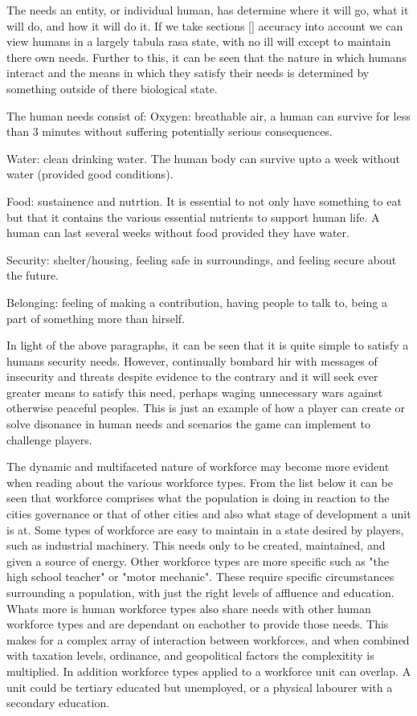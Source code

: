 The needs an entity, or individual human, has determine where it will go, what it will do, and how it will do it. If we take sections [] accuracy into account we can view humans in a largely tabula rasa state, with no ill will except to maintain there own needs. Further to this, it can be seen that the nature in which humans interact and the means in which they satisfy their needs is determined by something outside of there biological state. 

The human needs consist of:
Oxygen: breathable air, a human can survive for less than 3 minutes without suffering potentially serious consequences. 

Water: clean drinking water. The human body can survive upto a week without water (provided good conditions). 

Food: sustainence and nutrtion. It is essential to not only have something to eat but that it contains the various essential nutrients to support human life. A human can last several weeks without food provided they have water.

Security: shelter/housing, feeling safe in surroundings, and feeling secure about the future.

Belonging: feeling of making a contribution, having people to talk to, being a part of something more than hirself.

In light of the above paragraphs, it can be seen that it is quite simple to satisfy a humans security needs. However, continually bombard hir with messages of insecurity and threats despite evidence to the contrary and it will seek ever greater means to satisfy this need, perhaps waging unnecessary wars against otherwise peaceful peoples. This is just an example of how a player can create or solve disonance in human needs and scenarios the game can implement to challenge players.



The dynamic and multifaceted nature of workforce may become more evident when reading about the various workforce types. From the list below it can be seen that workforce comprises what the population is doing in reaction to the cities governance or that of other cities and also what stage of development a unit is at. Some types of workforce are easy to maintain in a state desired by players, such as industrial machinery. This needs only to be created, maintained, and given a source of energy. Other workforce types are more specific such as "the high school teacher" or "motor mechanic". These require specific circumstances surrounding a population, with just the right levels of affluence and education. Whats more is human workforce types also share needs with other human workforce types and are dependant on eachother to provide those needs. This makes for a complex array of interaction between workforces, and when combined with taxation levels, ordinance, and geopolitical factors the complexitity is multiplied. In addition workforce types applied to a workforce unit can overlap. A unit could be tertiary educated but unemployed, or a physical labourer with a secondary education. 

